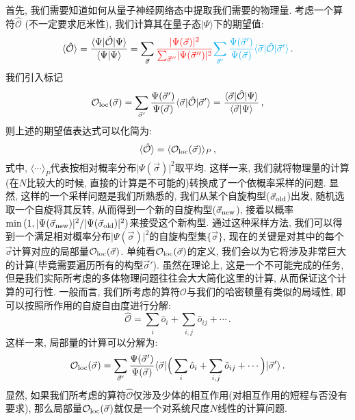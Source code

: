 \documentclass[10pt]{article}
\newcommand{\qket}{\rangle}
\newcommand{\qbar}{\langle}
\begin{document}
首先, 我们需要知道如何从量子神经网络态中提取我们需要的物理量. 
考虑一个算符$\mathcal{\hat{O}}$ (不一定要求厄米性), 我们计算其在量子态$\lvert\Psi\qket$下的期望值:
\[ \qbar\mathcal{\hat{O}}\qket = \frac{\qbar\Psi\vert\hat{\mathcal{O}}\vert\Psi\qket}{\qbar\Psi\vert\Psi\qket} = \sum_{\vec{\sigma}} {\color{red}{\frac{\lvert\Psi(\vec{\sigma})\rvert^2}{\sum_{\vec{\sigma}''}\lvert\Psi(\vec{\sigma}'')\rvert^{2}}}} {\color{cyan}{\sum_{\vec{\sigma}'}\frac{\Psi(\vec{\sigma}')}{\Psi(\vec{\sigma})} \qbar\vec{\sigma}\vert\hat{\mathcal{O}}\vert\vec{\sigma}'\qket}}\,. \]
我们引入标记
\[ \mathcal{O}_{\rm loc}(\vec{\sigma}) = \sum_{\vec{\sigma}'}\frac{\Psi(\vec{\sigma}')}{\Psi(\vec{\sigma})} \qbar\vec{\sigma}\vert\hat{\mathcal{O}}\vert\vec{\sigma}'\qket = \frac{\qbar\vec{\sigma}\rvert\hat{\mathcal{O}}\lvert\Psi\qket}{\qbar\vec{\sigma}\vert\Psi\qket}\,, \]
则上述的期望值表达式可以化简为:
\[ \qbar\hat{\mathcal{O}}\qket = \qbar\mathcal{O}_{\rm loc}(\vec{\sigma})\qket_{P}\,, \]
式中, $\qbar\cdots\qket_{P}$代表按相对概率分布$\lvert\Psi(\vec{\sigma})\rvert^2$取平均. 
这样一来, 我们就将物理量的计算(在$N$比较大的时候, 直接的计算是不可能的)转换成了一个依概率采样的问题. 
显然, 这样的一个采样问题是我们所熟悉的, 我们从某个自旋构型($\vec{\sigma}_{\rm old}$)出发, 随机选取一个自旋将其反转, 从而得到一个新的自旋构型($\vec{\sigma}_{\rm new}$), 接着以概率$\min{(1, \lvert\Psi(\vec{\sigma}_{\rm new})\rvert^{2}/\lvert\Psi(\vec{\sigma}_{\rm old})\rvert^{2})}$来接受这个新构型. 
通过这种采样方法, 我们可以得到一个满足相对概率分布$\lvert\Psi(\vec{\sigma})\rvert^2$的自旋构型集$\{\vec{\sigma}\}$, 现在的关键是对其中的每个$\vec{\sigma}$计算对应的局部量$\mathcal{O}_{\rm loc}(\vec{\sigma})$. 
单纯看$\mathcal{O}_{\rm loc}(\vec{\sigma})$的定义, 我们会以为它将涉及非常巨大的计算(毕竟需要遍历所有的构型$\vec{\sigma}'$). 
虽然在理论上, 这是一个不可能完成的任务, 但是我们实际所考虑的多体物理问题往往会大大简化这里的计算, 从而保证这个计算的可行性. 
一般而言, 我们所考虑的算符$\hat{\mathcal{O}}$与我们的哈密顿量有类似的局域性, 即可以按照所作用的自旋自由度进行分解:
\[ \hat{\mathcal{O}} = \sum_{i} \hat{o}_{i} + \sum_{i,j} \hat{o}_{ij} + \cdots\,. \]
这样一来, 局部量的计算可以分解为:
\[ \mathcal{O}_{\rm loc}(\vec{\sigma}) = \sum_{\vec{\sigma}'}\frac{\Psi(\vec{\sigma}')}{\Psi(\vec{\sigma})} \qbar\vec{\sigma}\vert\Big(\sum_{i} \hat{o}_{i} + \sum_{i,j} \hat{o}_{ij} + \cdots\Big)\vert\vec{\sigma}'\qket\,. \]
显然, 如果我们所考虑的算符$\hat{\mathcal{O}}$仅涉及少体的相互作用(对相互作用的短程与否没有要求), 那么局部量$\mathcal{O}_{\rm loc}(\vec{\sigma})$就仅是一个对系统尺度$N$线性的计算问题. 
\end{document}
